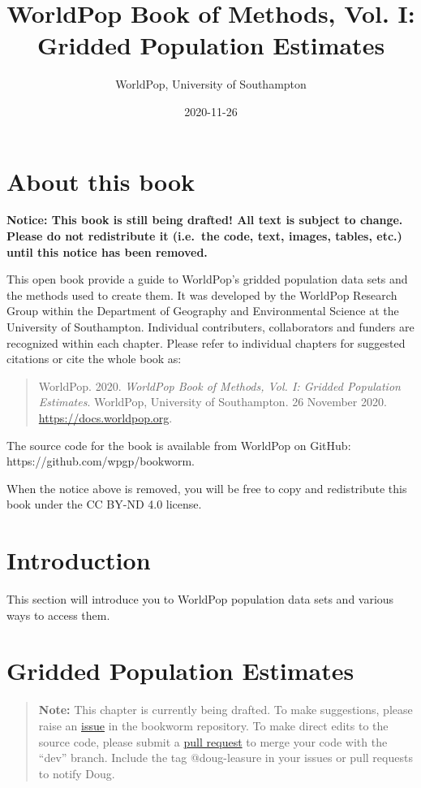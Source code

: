 \documentclass[]{book}
\title{WorldPop Book of Methods, Vol. I: Gridded Population Estimates}
\author{WorldPop, University of Southampton}
\date{2020-11-26}
\begin{document}
\maketitle

{
\setcounter{tocdepth}{1}
\tableofcontents
}
\chapter*{About this book}\label{about-this-book}

\textbf{Notice: This book is still being drafted! All text is subject to
change. Please do not redistribute it (i.e.~the code, text, images,
tables, etc.) until this notice has been removed.}

This open book provide a guide to WorldPop's gridded population data
sets and the methods used to create them. It was developed by the
WorldPop Research Group within the Department of Geography and
Environmental Science at the University of Southampton. Individual
contributers, collaborators and funders are recognized within each
chapter. Please refer to individual chapters for suggested citations or
cite the whole book as:

\begin{quote}
WorldPop. 2020. \emph{WorldPop Book of Methods, Vol. I: Gridded
Population Estimates}. WorldPop, University of Southampton. 26 November
2020. \url{https://docs.worldpop.org}.
\end{quote}

The source code for the book is available from WorldPop on GitHub:
https://github.com/wpgp/bookworm.

When the notice above is removed, you will be free to copy and
redistribute this book under the CC BY-ND 4.0 license.

\chapter*{Introduction}\label{introduction}

This section will introduce you to WorldPop population data sets and
various ways to access them.

\chapter{Gridded Population
Estimates}\label{gridded-population-estimates}

\begin{quote}
\textbf{Note:} This chapter is currently being drafted. To make
suggestions, please raise an
\href{https://github.com/wpgp/bookworm/issues}{issue} in the bookworm
repository. To make direct edits to the source code, please submit a
\href{https://github.com/wpgp/bookworm/pulls}{pull request} to merge
your code with the ``dev'' branch. Include the tag @doug-leasure in your
issues or pull requests to notify Doug.
\end{quote}
\end{document}
